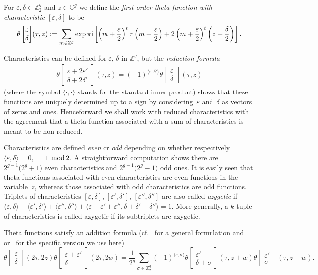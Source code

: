 \documentclass[pdftex]{sigma}
\numberwithin{equation}{section}
\newcommand{\de}{\delta}
\newcommand{\ep}{\varepsilon}
\newcommand{\CC}{{\mathbb{C}}}
\newcommand{\ZZ}{{\mathbb{Z}}}
\def\ZZ{{\mathbb Z}}
\def\t{\theta}
\def\s{\sigma}
\def\tt#1#2{{\t\left[\begin{matrix}{#1}\\ {#2}\end{matrix}\right]}}
\begin{document}
For $\ep,\de\in \ZZ_2^g$ and $z\in \CC^g$ we define the {\it first order theta function with characteristic $[\ep,\de]$} to be
\[
\tt\ep\de(\tau,z):=\sum\limits_{m\in\ZZ^g} \exp \pi {\rm i} \left[\left(
m+\frac{\ep}{2}\right)^t\tau \left(m+\frac{\ep}{2}\right)+2\left(m+\frac{\ep}{2}\right)^t\left(z+
\frac{\de}{2}\right)\right].
\]

Characteristics can be defined for $\ep$, $\de$ in $\ZZ^g$, but the {\it reduction formula}
\begin{gather*}%
\tt{\ep+2\ep'}{\de+2\de'} (\tau , z) = (-1)^{\langle \ep ,\de'\rangle} \tt\ep\de(\tau,z) \end{gather*}
(where the symbol $\langle \cdot , \cdot \rangle$ stands for the standard inner product) shows that these functions are uniquely determined up to a sign by considering~$\ep$ and~$\de$ as vectors of zeros and ones. Henceforward we shall work with reduced characteristics with the agreement that a theta function associated with a sum of characteristics is meant to be non-reduced.

Characteristics are defined {\it even} or {\it odd} depending on whether respectively $\langle \ep , \de\rangle =0,\, =1$ ${\rm mod}\, 2$. A straightforward computation shows there are $ 2^{g-1}\big( 2^{g}+1\big)$ even characteristics and $2^{g-1}\big( 2^{g}-1\big)$ odd ones. It is easily seen that theta functions associated with even characteristics are even functions in the variable~$z$, whereas those associated with odd characteristics are odd functions.
Triplets of characteristics $[\ep,\de]$, $[\ep',\de']$, $[\ep'',\de'']$ are also called {\it azygetic} if $\langle \ep , \de\rangle+\langle\ep' , \de'\rangle+\langle\ep'' , \de''\rangle+\langle\ep + \ep' + \ep'' , \de + \de' + \de''\rangle=1$. More generally, a $k$-tuple of characteristics is called azygetic if its subtriplets are azygetic.

Theta functions satisfy an addition formula (cf.~\cite{Ig72} for a general formulation and~\cite{Gr} or~\cite{GSM} for the specific version we use here)
\[
\theta \begin{bmatrix} \ep \\ \de \end{bmatrix} (2\tau, 2z) \theta \begin{bmatrix} \ep + \ep' \\ \de \end{bmatrix} (2\tau, 2w)= \frac{1}{2^g} \sum_{\s \in \ZZ_2^{g}}(-1)^{\langle \ep , \s\rangle} \theta \begin{bmatrix} \ep '\\ \de +\s \end{bmatrix} (\tau, z+w) \theta \begin{bmatrix} \ep'\\ \s \end{bmatrix} (\tau,z-w).
\]
\end{document}
